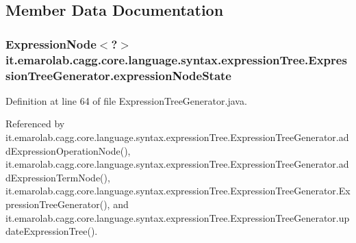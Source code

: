 \subsection{Member Data Documentation}
\hypertarget{classit_1_1emarolab_1_1cagg_1_1core_1_1language_1_1syntax_1_1expressionTree_1_1ExpressionTreeGenerator_a32bbaf741ee244c0bfbf8f58119c52bd}{
\subsubsection[{expression\-Node\-State}]{\setlength{\rightskip}{0pt plus 5cm}Expression\-Node$<$?$>$ it.\-emarolab.\-cagg.\-core.\-language.\-syntax.\-expression\-Tree.\-Expression\-Tree\-Generator.\-expression\-Node\-State\hspace{0.3cm}{\ttfamily [private]}}}\label{classit_1_1emarolab_1_1cagg_1_1core_1_1language_1_1syntax_1_1expressionTree_1_1ExpressionTreeGenerator_a32bbaf741ee244c0bfbf8f58119c52bd}


Definition at line 64 of file Expression\-Tree\-Generator.\-java.



Referenced by it.\-emarolab.\-cagg.\-core.\-language.\-syntax.\-expression\-Tree.\-Expression\-Tree\-Generator.\-add\-Expression\-Operation\-Node(), it.\-emarolab.\-cagg.\-core.\-language.\-syntax.\-expression\-Tree.\-Expression\-Tree\-Generator.\-add\-Expression\-Term\-Node(), it.\-emarolab.\-cagg.\-core.\-language.\-syntax.\-expression\-Tree.\-Expression\-Tree\-Generator.\-Expression\-Tree\-Generator(), and it.\-emarolab.\-cagg.\-core.\-language.\-syntax.\-expression\-Tree.\-Expression\-Tree\-Generator.\-update\-Expression\-Tree().


